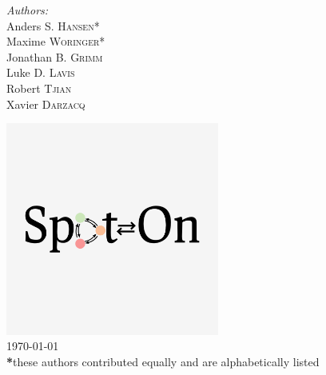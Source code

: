 \begin{titlepage}
\emph{Authors:}\\
Anders S. \textsc{Hansen}*\\ %
Maxime \textsc{Woringer}*\\ %
Jonathan B. \textsc{Grimm}\\
Luke D. \textsc{Lavis}\\
Robert \textsc{Tjian}\\
Xavier \textsc{Darzacq}\\
\vfill



\includegraphics[width=7cm]{../logo/spoton_logo_square.png}\\[0.3cm] %


{\large \today}\\[0.3cm] %
\small \textbf{*}these authors contributed equally and are alphabetically listed



\vfill %

\end{titlepage}


